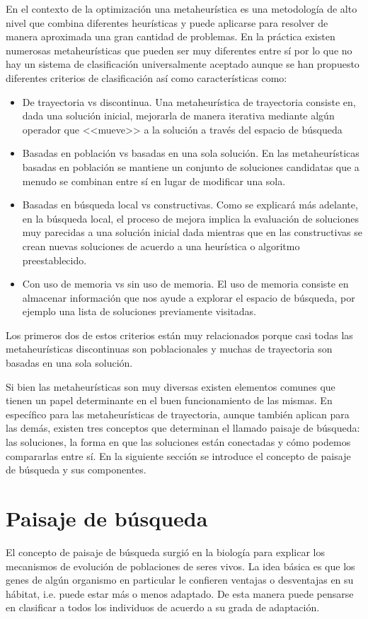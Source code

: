 En el contexto de la optimización una metaheurística es una metodología de alto nivel que combina diferentes heurísticas y puede aplicarse para resolver de manera aproximada una gran cantidad de problemas. En la práctica existen numerosas metaheurísticas que pueden ser muy diferentes entre sí por lo que no hay un sistema de clasificación universalmente aceptado aunque se han propuesto diferentes criterios de clasificación \cite{Stegherr2020} así como características como:
\begin{itemize}
\item De trayectoria vs discontinua. Una metaheurística de trayectoria consiste en, dada una solución inicial, mejorarla de manera iterativa mediante algún operador que <<mueve>> a la solución a través del espacio de búsqueda %
\item Basadas en población vs basadas en una sola solución. En las metaheurísticas basadas en población se mantiene un conjunto de soluciones candidatas que a menudo se combinan entre sí en lugar de modificar una sola.
\item Basadas en búsqueda local vs constructivas. Como se explicará más adelante, en la búsqueda local, el proceso de mejora implica la evaluación de soluciones muy parecidas a una solución inicial dada mientras que en las constructivas se crean nuevas soluciones de acuerdo a una heurística o algoritmo preestablecido.
\item Con uso de memoria vs sin uso de memoria. El uso de memoria consiste en almacenar información que nos ayude a explorar el espacio de búsqueda, por ejemplo una lista de soluciones previamente visitadas.
\end{itemize} 
Los primeros dos de estos criterios están muy relacionados porque casi todas las metaheurísticas discontinuas son poblacionales y muchas de trayectoria son basadas en una sola solución.


Si bien las metaheurísticas son muy diversas existen elementos comunes que tienen un papel determinante en el buen funcionamiento de las mismas. En específico para las metaheurísticas de trayectoria, aunque también aplican para las demás, existen tres conceptos que determinan el llamado paisaje de búsqueda: las soluciones, la forma en que las soluciones están conectadas y cómo podemos compararlas entre sí. En la siguiente sección se introduce el concepto de paisaje de búsqueda y sus componentes.
\section{Paisaje de búsqueda}
El concepto de paisaje de búsqueda surgió en la biología para explicar los mecanismos de evolución de poblaciones de seres vivos\cite{wright1932roles}. La idea básica es que los genes de algún organismo en particular le confieren ventajas o desventajas en su hábitat, i.e. puede estar más o menos adaptado. De esta manera puede pensarse en clasificar a todos los individuos de acuerdo a su grada de adaptación. 

